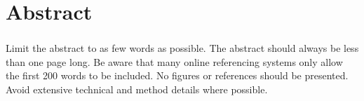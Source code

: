 \chapter*{Abstract} 
\subsection*{\thesistitle}

Limit the abstract to as few words as possible.  The abstract should always be less than one page long.  Be aware that many online referencing systems only allow the first 200 words to be included.  No figures or references should be presented. Avoid extensive technical and method details where possible.
